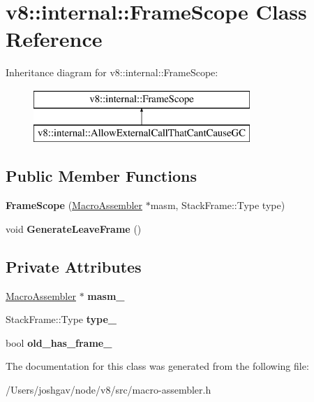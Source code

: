 \hypertarget{classv8_1_1internal_1_1_frame_scope}{}\section{v8\+:\+:internal\+:\+:Frame\+Scope Class Reference}
\label{classv8_1_1internal_1_1_frame_scope}
Inheritance diagram for v8\+:\+:internal\+:\+:Frame\+Scope\+:\begin{figure}[H]
\begin{center}
\leavevmode
\includegraphics[height=2.000000cm]{classv8_1_1internal_1_1_frame_scope}
\end{center}
\end{figure}
\subsection*{Public Member Functions}
\begin{DoxyCompactItemize}
\item 
{\bfseries Frame\+Scope} (\hyperlink{classv8_1_1internal_1_1_macro_assembler}{Macro\+Assembler} $\ast$masm, Stack\+Frame\+::\+Type type)\hypertarget{classv8_1_1internal_1_1_frame_scope_aadd215270522f8ed1e3b0ae864be3df9}{}\label{classv8_1_1internal_1_1_frame_scope_aadd215270522f8ed1e3b0ae864be3df9}

\item 
void {\bfseries Generate\+Leave\+Frame} ()\hypertarget{classv8_1_1internal_1_1_frame_scope_a9f06dab495ac41ce64f39d55a79452d4}{}\label{classv8_1_1internal_1_1_frame_scope_a9f06dab495ac41ce64f39d55a79452d4}

\end{DoxyCompactItemize}
\subsection*{Private Attributes}
\begin{DoxyCompactItemize}
\item 
\hyperlink{classv8_1_1internal_1_1_macro_assembler}{Macro\+Assembler} $\ast$ {\bfseries masm\+\_\+}\hypertarget{classv8_1_1internal_1_1_frame_scope_a472cd01bfdfcf0dfce9ab67dcc3db00f}{}\label{classv8_1_1internal_1_1_frame_scope_a472cd01bfdfcf0dfce9ab67dcc3db00f}

\item 
Stack\+Frame\+::\+Type {\bfseries type\+\_\+}\hypertarget{classv8_1_1internal_1_1_frame_scope_a1df71f490ae14a77239531afb485911a}{}\label{classv8_1_1internal_1_1_frame_scope_a1df71f490ae14a77239531afb485911a}

\item 
bool {\bfseries old\+\_\+has\+\_\+frame\+\_\+}\hypertarget{classv8_1_1internal_1_1_frame_scope_ad2c518b811b94607ab5a34caef3bf2bb}{}\label{classv8_1_1internal_1_1_frame_scope_ad2c518b811b94607ab5a34caef3bf2bb}

\end{DoxyCompactItemize}


The documentation for this class was generated from the following file\+:\begin{DoxyCompactItemize}
\item 
/\+Users/joshgav/node/v8/src/macro-\/assembler.\+h\end{DoxyCompactItemize}
